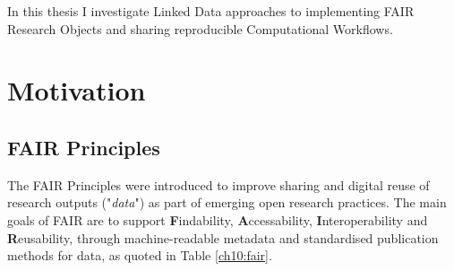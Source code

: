 In this thesis I investigate Linked Data approaches to implementing FAIR Research Objects and sharing reproducible Computational Workflows.





\section{Motivation}

\subsection{FAIR Principles}
\label{ch10:fair-principles}

The \acrshort{FAIR} Principles \cite{Wilkinson 2016} were introduced to improve sharing and digital reuse of research outputs ("\emph{data}") as part of emerging open research practices. The main goals of FAIR are to support \textbf{F}indability, \textbf{A}ccessability, \textbf{I}nteroperability and \textbf{R}eusability, through machine-readable metadata and standardised publication methods for data, as quoted in Table \vref{ch10:fair}.

